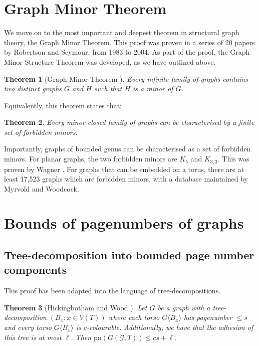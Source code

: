 \documentclass[]{report}
\newcommand{\pn}{\text{pn}}
\newtheorem{theorem}{Theorem}
\theoremstyle{definition}
\numberwithin{theorem}{section}
\numberwithin{equation}{section}
\begin{document}
\section{Graph Minor Theorem}\label{sec:Graph Minor Theorem}
We move on to the most important and deepest theorem in structural graph theory, the Graph Minor Theorem. This proof was proven in a series of 20 papers by Robertson and Seymour, from 1983 to 2004. As part of the proof, the Graph Minor Structure Theorem was developed, as we have outlined above. 
\begin{theorem}[Graph Minor Theorem \cite{robertsonGraphMinorsXX2004}]
	Every infinite family of graphs contains two distinct graphs $G$ and $H$ such that $H$ is a minor of $G$.
\end{theorem}
Equivalently, this theorem states that:
\begin{theorem}
	Every minor-closed family of graphs can be characterised by a finite set of forbidden minors.
\end{theorem}
Importantly, graphs of bounded genus can be characterised as a set of forbidden minors.
For planar graphs, the two forbidden minors are $K_5$ and $K_{3,3}$. This was proven by Wagner \cite{wagnerUeberEigenschaftEbenen1937}. 
For graphs that can be embedded on a torus, there are at least 17,523 graphs which are forbidden minors, with a database maintained by Myrvold and Woodcock\cite{myrvoldLargeSetTorus2018}. 

\section{Bounds of pagenumbers of graphs}\label{sec:BoundedPagenumber} 
\subsection{Tree-decomposition into bounded page number components}\label{ssec:Clique_sum_Pagenumber_bound}

This proof has been adapted into the language of tree-decompositions. 
\begin{theorem}[Hickingbotham and Wood \cite{hickingbothamStackNumberCliqueSum2023}]\label{thm:clique_sum_pagenumber_bound}
	Let $G$ be a graph with a tree-decomposition $(B_x: x \in V(T))$ where each torso $G \langle B_x \rangle$ has pagenumber $\leq s$ and every torso $G \langle B_x \rangle$ is $c$-colourable. Additionally, we have that the adhesion of this tree is at most $\ell$.
	 Then $\pn(G(\mathcal{G}, T)) \leq cs + \ell$.  
\end{theorem}
\end{document}
